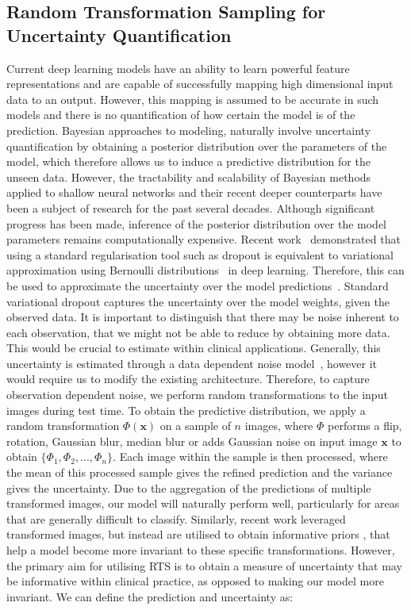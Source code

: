 \documentclass[3p]{elsarticle}
\begin{document}
\subsection{Random Transformation Sampling for Uncertainty Quantification}

Current deep learning models have an ability to learn powerful feature representations and are capable of successfully mapping high dimensional input data to an output. However, this mapping is assumed to be accurate in such models and there is no quantification of how certain the model is of the prediction. Bayesian approaches to modeling, naturally involve uncertainty quantification by obtaining a posterior distribution over the parameters of the model, which therefore allows us to induce a predictive distribution for the unseen data. However, the tractability and scalability of Bayesian methods applied to shallow neural networks and their recent deeper counterparts have been a subject of research for the past several decades. Although significant progress has been made, inference of the posterior distribution over the model parameters remains computationally expensive. Recent work~\citep{gal2016dropout} demonstrated that using a standard regularisation tool such as dropout is equivalent to variational approximation using Bernoulli distributions~\citep{bishop2012pattern} in deep learning. Therefore, this can be used to approximate the uncertainty over the model predictions~\citep{Gal2016Uncertainty}. Standard variational dropout captures the uncertainty over the model weights, given the observed data. It is important to distinguish that there may be noise inherent to each observation, that we might not be able to reduce by obtaining more data. This would be crucial to estimate within clinical applications. Generally, this uncertainty is estimated through a data dependent noise model~\citep{kendall2017uncertainties}, however it would require us to modify the existing architecture. Therefore, to capture observation dependent noise, we perform random transformations to the input images during test time. To obtain the predictive distribution, we apply a random transformation $\Phi(\textbf{x})$ on a sample of $n$ images, where $\Phi$ performs a flip, rotation, Gaussian blur, median blur or adds Gaussian noise on input image $\textbf{x}$ to obtain $\{\Phi_1, \Phi_2, ... , \Phi_n\}$. Each image within the sample is then processed, where the mean of this processed sample gives the refined prediction and the variance gives the uncertainty. Due to the aggregation of the predictions of multiple transformed images, our model will naturally perform well, particularly for areas that are generally difficult to classify. Similarly, recent work leveraged transformed images, but instead are utilised to obtain informative priors \citep{nalisnick2018learning}, that help a model become more invariant to these specific transformations. However, the primary aim for utilising RTS is to obtain a measure of uncertainty that may be informative within clinical practice, as opposed to making our model more invariant. We can define the prediction and uncertainty as:
\end{document}
